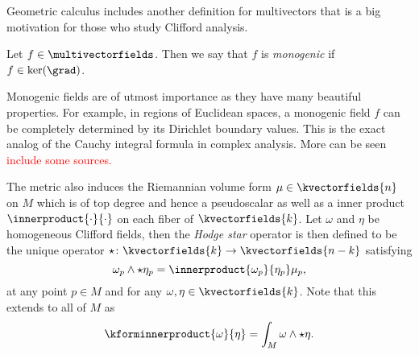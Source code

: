 Geometric calculus includes another definition for multivectors that is a big motivation for those who study Clifford analysis.  

\begin{definition}
 Let $f \in \multivectorfields$. Then we say that $f$ is \emph{monogenic} if $f \in \ker(\grad)$.
\end{definition}

Monogenic fields are of utmost importance as they have many beautiful properties.  For example, in regions of Euclidean spaces, a monogenic field $f$ can be completely determined by its Dirichlet boundary values.  This is the exact analog of the Cauchy integral formula in complex analysis.  More can be seen \textcolor{red}{include some sources.}




The metric also induces the Riemannian volume form $\mu \in \kvectorfields{n}$ on $M$ which is of top degree and hence a pseudoscalar as well as a inner product $\innerproduct{\cdot}{\cdot}$ on each fiber of $\kvectorfields{k}$. Let $\omega$ and $\eta$ be homogeneous Clifford fields, then the \emph{Hodge star} operator is then defined to be the unique operator $\star \colon \kvectorfields{k} \to \kvectorfields{n-k}$ satisfying
\[
\omega_p \wedge \star \eta_p = \innerproduct{\omega_p}{\eta_p} \mu_p,
\]
at any point $p \in M$ and for any $\omega,\eta \in \kvectorfields{k}$.  Note that this extends to all of $M$ as
\[
\kforminnerproduct{\omega}{\eta} = \int_M \omega \wedge \star \eta.
\]

